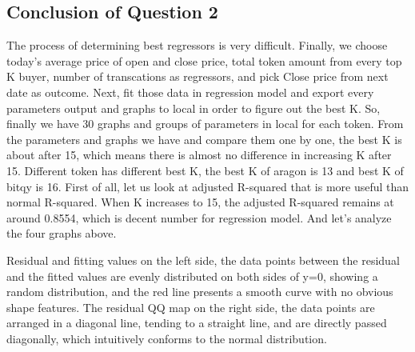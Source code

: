 \documentclass[11pt, letterpaper]{article} %
\begin{document}
\subsection*{Conclusion of Question 2}
The process of determining best regressors is very difficult. Finally, we choose today's average price of open and close price, total token amount from every top K buyer, number of transcations as regressors, and pick Close price from next date as outcome. Next, fit those data in regression model and export every parameters output and graphs to local in order to figure out the best K. So, finally we have 30 graphs and groups of parameters in local for each token. From the parameters and graphs we have and compare them one by one, the best K is about after 15, which means there is almost no difference in increasing K after 15. Different token has different best K, the best K of aragon is 13 and best K of bitqy is 16. First of all, let us look at adjusted R-squared that is more useful than normal R-squared. When K increases to 15, the adjusted R-squared remains at around 0.8554, which is decent number for regression model. And let's analyze the four graphs above.

Residual and fitting values on the left side, the data points between the residual and the fitted values are evenly distributed on both sides of y=0, showing a random distribution, and the red line presents a smooth curve with no obvious shape features.
The residual QQ map on the right side, the data points are arranged in a diagonal line, tending to a straight line, and are directly passed diagonally, which intuitively conforms to the normal distribution.
\end{document}
